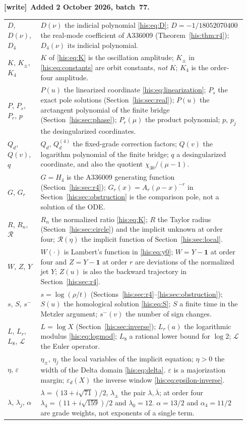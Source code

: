 \documentclass[11pt]{article}
\theoremstyle{remark}\newtheorem{remark}[theorem]{Remark}
\newcommand{\eps}{\varepsilon}
\newcommand{\la}{\lambda}
\newcommand{\lab}{{\overline{\lambda}}}
\numberwithin{equation}{section}
\newenvironment{writenote}[1][]{\par\smallskip\begingroup\small
 \noindent\textbf{[write]}\if\relax\detokenize{#1}\relax\else~\textbf{#1.}\fi\ }%
 {\par\endgroup\smallskip}
\begin{document}
\begin{writenote}[Added 2 October 2026, batch~77]
\begin{center}
\begin{tabular}{@{}p{0.13\linewidth}p{0.81\linewidth}@{}}
$D$, $D(\nu)$, $D_4$ & $D(\nu)$ the indicial polynomial \eqref{his:eq:D}; $D=-1/18052070400$ the real-mode coefficient of A336009 (Theorem~\ref{his:thm:r4}); $D_4(\nu)$ its indicial polynomial.\\
$K$, $K_\pm$, $K_4$ & $K$ of \eqref{his:eq:K} is the oscillation amplitude; $K_\pm$ in \eqref{his:eq:constants} are orbit constants, \emph{not} $K$; $K_4$ is the order-four amplitude.\\
$P$, $P_s$, $P_r$, $p$ & $P(u)$ the linearized coordinate \eqref{his:eq:linearization}; $P_s$ the exact pole solutions (Section~\ref{his:sec:real}); $P(u)$ the arctangent polynomial of the finite bridge (Section~\ref{his:sec:phase}); $P_r(\mu)$ the product polynomial; $p$, $p_j$ the desingularized coordinates.\\
$Q_d$, $Q(v)$, $q$ & $Q_d$, $Q^{(4)}_d$ the fixed-grade correction factors; $Q(v)$ the logarithm polynomial of the finite bridge; $q$ a desingularized coordinate, and also the quotient $\chi_{30}/(\mu-1)$.\\
$G$, $G_r$ & $G=H_4$ is the A336009 generating function (Section~\ref{his:sec:r4}); $G_r(x)=A_r(\rho-x)^{-r}$ in Section~\ref{his:sec:obstruction} is the comparison pole, not a solution of the ODE.\\
$R$, $R_n$, $\mathcal R$ & $R_n$ the normalized ratio \eqref{his:eq:K}; $R$ the Taylor radius (Section~\ref{his:sec:circle}) and the implicit unknown at order four; $\mathcal R(\eta)$ the implicit function of Section~\ref{his:sec:local}.\\
$W$, $Z$, $Y$ & $W(\cdot)$ is Lambert's function in \eqref{his:eq:y0}; $W=Y-\mathbf 1$ at order four and $Z=Y-\mathbf 1$ at order $r$ are deviations of the normalized jet $Y$; $Z(u)$ is also the backward trajectory in Section~\ref{his:sec:r4}.\\
$s$, $S$, $s^-$ & $s=\log(\rho/t)$ (Sections~\ref{his:sec:r4}--\ref{his:sec:obstruction}); $S(u)$ the homological solution \eqref{his:eq:S}; $S$ a finite time in the Metzler argument; $s^-(v)$ the number of sign changes.\\
$L$, $L_r$, $L_8$, $\mathcal L$ & $L=\log X$ (Section~\ref{his:sec:inverse}); $L_r(a)$ the logarithmic modulus \eqref{his:eq:logmod}; $L_8$ a rational lower bound for $\log 2$; $\mathcal L$ the Euler operator.\\
$\eta$, $\eps$ & $\eta_\pm$, $\eta_j$ the local variables of the implicit equation; $\eta>0$ the width of the Delta domain \eqref{his:eq:delta}. $\eps$ is a majorization margin; $\eps_d(X)$ the inverse window \eqref{his:eq:epsilon-inverse}.\\
$\la$, $\la_j$, $\alpha$ & $\la=(13+i\sqrt{71})/2$, $\la_\pm$ the pair $\la,\lab$; at order four $\la_4=(11+i\sqrt{159})/2$ and $\la_0=12$. $\alpha=13/2$ and $\alpha_4=11/2$ are grade weights, not exponents of a single term.\\
\bottomrule
\end{tabular}
\end{center}
\end{writenote}
\end{document}
